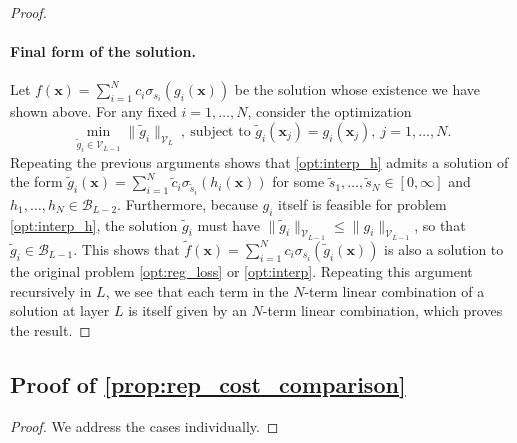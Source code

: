\documentclass{article}
\def\vx{{\bm{x}}}
\def\cB{{\mathcal{B}}}
\def\cV{{\mathcal{V}}}
\begin{document}
\begin{appendices}
\begin{proof}
    \paragraph{Final form of the solution.} Let $f(\vx) = \sum_{i=1}^N c_i \sigma_{s_i}(g_i(\vx))$ be the solution whose existence we have shown above. For any fixed $i = 1, \dots, N$, consider the optimization
    \begin{equation} \label{opt:interp_h}
     \min_{\tilde{g}_i \in \cV_{L-1}} \| \tilde{g}_i  \|_{\cV_L} \ , \ \mbox{subject to } \tilde{g}_i (\vx_j)=g_i(\vx_j), \ j=1,\dots,N.
    \end{equation}
    Repeating the previous arguments shows that \eqref{opt:interp_h} admits a solution of the form $\tilde{g}_i (\vx) = \sum_{i=1}^N \tilde{c}_i \sigma_{\tilde{s}_i}(h_i(\vx))$ for some $\tilde{s}_1, \dots, \tilde{s}_N \in [0,\infty]$ and $h_1, \dots, h_N \in \cB_{L-2}$. Furthermore, because $g_i$ itself is feasible for problem \eqref{opt:interp_h}, the solution $\tilde{g}_i$ must have $\| \tilde{g}_i \|_{\cV_{L-1}} \leq \| g_i \|_{\cV_{L-1}}$, so that $\tilde{g}_i \in \cB_{L-1}$. This shows that $\tilde{f}(\vx) = \sum_{i=1}^N c_i \sigma_{s_i}(\tilde{g}_i (\vx))$ is also a solution to the original problem \eqref{opt:reg_loss} or \eqref{opt:interp}. Repeating this argument recursively in $L$, we see that each term in the $N$-term linear combination of a solution at layer $L$ is itself given by an $N$-term linear combination, which proves the result.
\end{proof}



\subsection{Proof of \cref{prop:rep_cost_comparison}} \label{appendix:proof_rep_cost_comparison}
\begin{proof}
We address the cases individually.

\end{proof}
\end{appendices}
\end{document}
